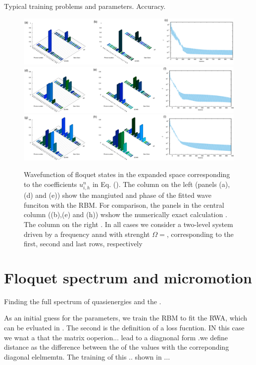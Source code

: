 \documentclass[pra,twocolumn,showkeys,preprintnumbers, amsmath,amssymb, aps,A4paper]{revtex4-1}
\begin{document}
Typical training problems and parameters. Accuracy. 


\begin{figure}
\centering
\includegraphics[width=\textwidth]{FloquetvsRBM_Floquet1st.eps}
\includegraphics[width=\textwidth]{FloquetvsRBM_Floquet2nd.eps}
\includegraphics[width=\textwidth]{FloquetvsRBM_Floquet3rd.eps}
\caption{\label{fig:FloquetFitRBM} Wavefunction of floquet states in the expanded space corresponding to the coefficients $u^{n}_{i,h}$ in Eq. (). The column on the left (panels (a),(d) and (e)) show the mangiuted and phase of the fitted wave funciton with the RBM. For comparison, the panels in the central column ((b),(e) and (h)) wshow the numerically exact calculation . The column on the right . In all cases we consider a two-level system driven by a frequency annd with strenght $\Omega=$, corresponding to the first, second and last rows, respectively}
\end{figure}


\section{\label{sec:RBMFloquetSpectrum} Floquet spectrum and micromotion}

Finding the full spectrum of quasienergies and the .

As an initial guess for the parameters, we train the RBM to fit the RWA, which can be evluated in . The second is the definition of a loss fucntion. IN this case we wnat a that the matrix ooperion... lead to a diagnonal form .we define distance as the difference between the of the values with the correponding diagonal elelmemtn. The training of this ..  shown in ...
\end{document}
